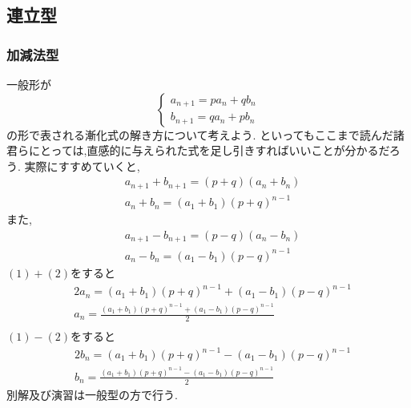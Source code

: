 
\subsection{連立型}
  \subsubsection{加減法型}
    一般形が
    \[
      \begin{cases}
        a_{n+1}=pa_{n}+qb_{n} \\
        b_{n+1}=qa_{n}+pb_{n}
      \end{cases}
    \]
    の形で表される漸化式の解き方について考えよう.
    といってもここまで読んだ諸君らにとっては,直感的に与えられた式を足し引きすればいいことが分かるだろう.
    実際にすすめていくと,
    \begin{align*}
      &a_{n+1}+b_{n+1}=(p+q)(a_{n}+b_{n})\\
      &a_n+b_n=(a_1+b_1)(p+q)^{n-1}\tag*{\(\cdots\) (1)}
    \end{align*}
    また,
    \begin{align*}
      &a_{n+1}-b_{n+1}=(p-q)(a_{n}-b_{n})\\
      &a_n-b_n=(a_1-b_1)(p-q)^{n-1}\tag*{\(\cdots\) (2)}
    \end{align*}
    $(1)+(2)$をすると
    \begin{align*}
      &2a_n=(a_1+b_1)(p+q)^{n-1}+(a_1-b_1)(p-q)^{n-1}\\
      &a_n=\frac{(a_1+b_1)(p+q)^{n-1}+(a_1-b_1)(p-q)^{n-1}}{2}\\
    \end{align*}
    $(1)-(2)$をすると
    \begin{align*}
      &2b_n=(a_1+b_1)(p+q)^{n-1}-(a_1-b_1)(p-q)^{n-1}\\
      &b_n=\frac{(a_1+b_1)(p+q)^{n-1}-(a_1-b_1)(p-q)^{n-1}}{2}
    \end{align*}
    別解及び演習は一般型の方で行う.
